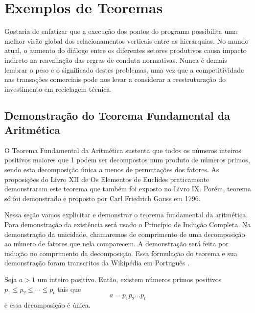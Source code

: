 \documentclass[fleqn]{profmat-cefet}
\begin{document}
\chapter{Exemplos de Teoremas}
\label{cap:exemplos_de_teoremas}

Gostaria de enfatizar que a execução dos pontos do programa possibilita uma
melhor visão global dos relacionamentos verticais entre as hierarquias. No mundo
atual, o aumento do diálogo entre os diferentes setores produtivos causa impacto
indireto na reavaliação das regras de conduta normativas. Nunca é demais lembrar
o peso e o significado destes problemas, uma vez que a competitividade nas
transações comerciais pode nos levar a considerar a reestruturação do
investimento em reciclagem técnica. 

\section{Demonstração do Teorema Fundamental da Aritmética}
\label{sec:demonstracao_aritmetica}

O Teorema Fundamental da Aritmética sustenta que todos os números inteiros
positivos maiores que 1 podem ser decompostos num produto de números primos,
sendo esta decomposição única a menos de permutações dos fatores. As proposições
do Livro XII de Os Elementos de Euclides praticamente demonstraram este teorema
que também foi exposto no Livro IX. Porém, teorema só foi demonstrado e proposto
por Carl Friedrich Gauss em 1796.

Nessa seção vamos explicitar e demonstrar o teorema fundamental da aritmética.
Para demonstração da existência será usado o Princípio de Indução Completa.
Na demonstração da unicidade, chamaremos de comprimento de uma decomposição ao
número de fatores que nela comparecem. A demonstração será feita por indução no
comprimento da decomposição. Essa formulação do teorema e sua demonstração 
foram transcritos da Wikipédia em Português \cite{WIKI:TEO_FUND_ARIT}.

\begin{teorema}
    \label{teo:aritimetica}
    Seja $a>1$ um inteiro positivo. Então, existem números primos positivos
    ${ p_1 \leq p_2 \leq \cdots \leq p_t}$ tais que 
    \[ a = p_1 p_2 \dots p_t \]
    e essa decomposição é única.
\end{teorema}
\end{document}
